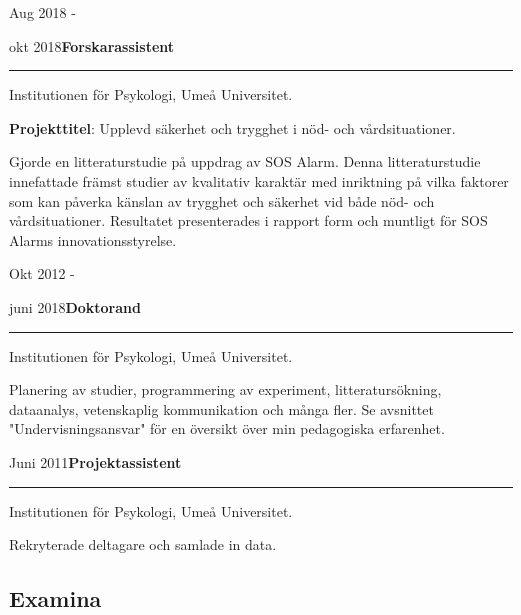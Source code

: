 \documentclass[]{article}
\begin{document}
Aug 2018 -

okt 2018\hspace{0.75cm}\textbf{Forskarassistent}\vspace{1mm}

\hrule
\begin{changemargin}{2.3cm}{2.4cm}

Institutionen för Psykologi, Umeå Universitet.

\textbf{Projekttitel}: Upplevd säkerhet och trygghet i nöd- och vårdsituationer.

Gjorde en litteraturstudie på uppdrag av SOS Alarm. Denna litteraturstudie innefattade främst studier av kvalitativ karaktär med inriktning på vilka faktorer som kan påverka känslan av trygghet och säkerhet vid både nöd- och vårdsituationer. Resultatet presenterades i rapport form och muntligt för SOS Alarms innovationsstyrelse.

\end{changemargin}

Okt 2012 -

juni 2018\hspace{0.75cm}\textbf{Doktorand}\vspace{1mm}

\hrule
\begin{changemargin}{2.3cm}{2.4cm}

Institutionen för Psykologi, Umeå Universitet.

Planering av studier, programmering av experiment, litteratursökning, dataanalys, vetenskaplig kommunikation och många fler. Se avsnittet "Undervisningsansvar" för en översikt över min pedagogiska erfarenhet.

\end{changemargin}

Juni 2011\hspace{0.75cm}\textbf{Projektassistent}\vspace{1mm}

\hrule
\begin{changemargin}{2.3cm}{2.4cm}

Institutionen för Psykologi, Umeå Universitet.

Rekryterade deltagare och samlade in data.

\end{changemargin}

\hypertarget{examina}{%
\subsection{Examina}\label{examina}}
\end{document}
